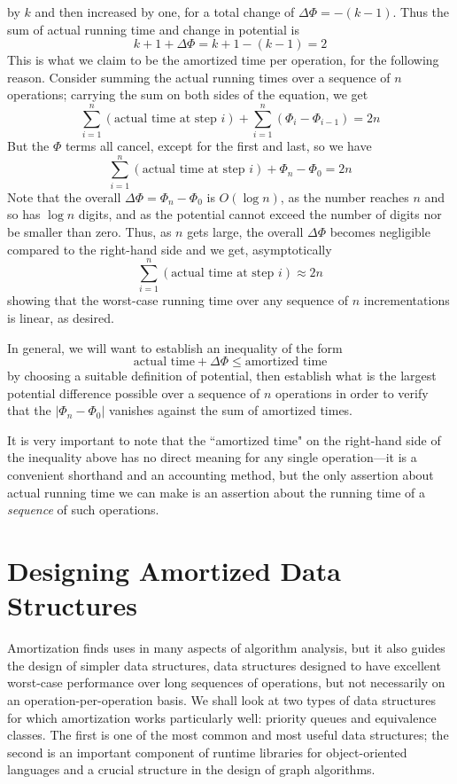 \documentclass[11pt]{article}
\begin{document}
by $k$ and then increased by one, for a total change of $\Delta\Phi = -(k-1)$.
Thus the sum of actual running time and change in potential is
 $$k+1 + \Delta\Phi = k+1 - (k-1) = 2$$
This is what we claim to be the amortized time per operation, for the
following reason.  Consider summing the actual running times over
a sequence of $n$ operations; carrying the sum on both sides of the
equation, we get
  $$\sum_{i=1}^n (\text{actual time at step $i$}) + \sum_{i=1}^n (\Phi_i-\Phi_{i
-1}) = 2n$$
But the $\Phi$ terms all cancel, except for the first and last, so we have
  $$\sum_{i=1}^n (\text{actual time at step $i$}) + \Phi_n-\Phi_0 = 2n$$
Note that the overall $\Delta\Phi = \Phi_n-\Phi_0$ is $O(\log n)$,
as the number reaches $n$ and so has $\log n$ digits, and as the potential
cannot exceed the number of digits nor be smaller than zero.
Thus, as $n$ gets large, the overall $\Delta\Phi$ becomes negligible
compared to the right-hand side and we get, asymptotically
  $$\sum_{i=1}^n (\text{actual time at step $i$}) \approx 2n$$
showing that the worst-case running time over any sequence of $n$
incrementations is linear, as desired.

In general, we will want to establish an inequality of the form
  $$\text{actual time} + \Delta\Phi \leq \text{amortized time}$$
by choosing a suitable definition of potential,
then establish what is the largest potential difference
possible over a sequence of $n$ operations in order to verify that
the $|\Phi_n-\Phi_0|$ vanishes against the sum of amortized times.

It is very important to note that the ``amortized time" on the
right-hand side of the inequality above has no direct meaning for
any single operation---it is a convenient shorthand and an accounting
method, but the only assertion about actual running time we can make
is an assertion about the running time of a \emph{sequence} of such
operations.

\section{Designing Amortized Data Structures}
Amortization finds uses in many aspects of algorithm analysis, but it also
guides the design of simpler data structures, data structures designed
to have excellent worst-case performance over long sequences of operations,
but not necessarily on an operation-per-operation basis.  We shall look at
two types of data structures for which amortization works particularly well:
priority queues and equivalence classes.  The first is one of the most common
and most useful data structures; the second is an important component of
runtime libraries for object-oriented languages and a crucial structure in
the design of graph algorithms.
\end{document}
